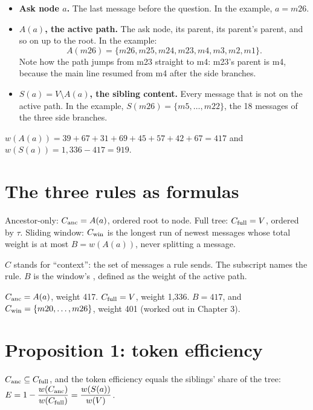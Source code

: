 \begin{itemize}
\item \textbf{Ask node $a$.} The last message before the question. In the example, $a = m26$.
\item \textbf{$A(a)$, the active path.} The ask node, its parent, its parent's parent, and so on up to the root. In the example:
\[A(m26) = \{m26, m25, m24, m23, m4, m3, m2, m1\}.\]
Note how the path jumps from m23 straight to m4: m23's parent is m4, because the main line resumed from m4 after the side branches.
\item \textbf{$S(a) = V \setminus A(a)$, the sibling content.} Every message that is not on the active path. In the example, $S(m26) = \{m5, \dots, m22\}$, the 18 messages of the three side branches.
\end{itemize}

\begin{example}
$w(A(a)) = 39+67+31+69+45+57+42+67 = 417$ and $w(S(a)) = 1{,}336 - 417 = 919$.
\end{example}

\section{The three rules as formulas}

\begin{paper}
Ancestor-only: $C_{\mathrm{anc}}=A(a)$, ordered root to node. Full tree: $C_{\mathrm{full}}=V$, ordered by $\tau$. Sliding window: $C_{\mathrm{win}}$ is the longest run of newest messages whose total weight is at most $B=w(A(a))$, never splitting a message.
\end{paper}

$C$ stands for ``context'': the set of messages a rule sends. The subscript names the rule. $B$ is the window's , defined as the weight of the active path.

\begin{example}
$C_{\mathrm{anc}} = A(a)$, weight 417. $C_{\mathrm{full}} = V$, weight 1,336. $B = 417$, and $C_{\mathrm{win}} = \{m20, \dots, m26\}$, weight 401 (worked out in Chapter 3).
\end{example}

\section{Proposition 1: token efficiency}

\begin{paper}
$C_{\mathrm{anc}}\subseteq C_{\mathrm{full}}$, and the token efficiency equals the siblings' share of the tree: $E=1-\dfrac{w(C_{\mathrm{anc}})}{w(C_{\mathrm{full}})}=\dfrac{w(S(a))}{w(V)}$.
\end{paper}

